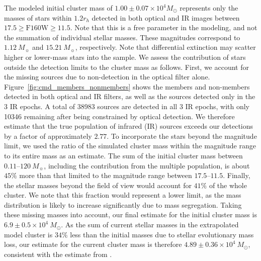 \documentclass[12pt]{ucsddissertation}
\begin{document}
\begin{CJK*}{UTF8}{gbsn}
The modeled initial cluster mass of $1.00 \pm 0.07 \times 10^4M_\odot$ represents only the masses of stars within $1.2 r_h$ detected in both optical and IR images between $17.5 \geq \mathrm{F160W} \geq 11.5$. Note that this is a free parameter in the modeling, and not the summation of individual stellar masses. These magnitudes correspond to $1.12~M_\sun$ and $15.21~M_\sun$, respectively. Note that differential extinction may scatter higher or lower-mass stars into the sample. We assess the contribution of stars outside the detection limits to the cluster mass as follows. First, we account for the missing sources due to non-detection in the optical filter alone. Figure~\ref{fig:cmd_members_nonmembers} shows the members and non-members detected in both optical and IR filters, as well as the sources detected only in the 3 IR epochs. A total of \num{38983} sources are detected in all $3$ IR epochs, with only \num{10346} remaining after being constrained by optical detection. We therefore estimate that the true population of infrared (IR) sources exceeds our detections by a factor of approximately $2.77$. To incorporate the stars beyond the magnitude limit, we used the ratio of the simulated cluster mass within the magnitude range to its entire mass as an estimate. The sum of the initial cluster mass between $0.11$--$120~M_\sun$, including the contribution from the multiple population, is about $45\%$ more than that limited to the magnitude range between $17.5$--$11.5$. Finally, the stellar masses beyond the field of view would account for $41\%$ of the whole cluster. We note that this fraction would represent a lower limit, as the mass distribution is likely to increase significantly due to mass segregation. Taking these missing masses into account, our final estimate for the initial cluster mass is $6.9 \pm 0.5 \times 10^4~M_\odot$. As the sum of current stellar masses in the extrapolated model cluster is $34\%$ less than the initial masses due to stellar evolutionary mass loss, our estimate for the current cluster mass is therefore $4.89 \pm 0.36 \times 10^4~M_\odot$, consistent with the estimate from \citet{Brandner-2008}.



\end{CJK*}
\end{document}
